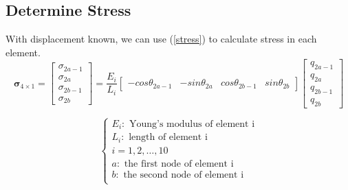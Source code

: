 \documentclass[12pt, a4paper]{article}
\begin{document}
\subsection{Determine Stress} 
    \qquad With displacement known, we can use (\ref{stress}) to calculate stress in each element.
    \begin{equation}
        \mathbf{\sigma}_{4\times1}=
        \left[
        \begin{array}{c}
             \sigma_{2a-1}  \\\sigma_{2a}\\\sigma_{2b-1}\\\sigma_{2b}
        \end{array}
        \right]
        =\frac{E_i}{L_i}
        \left[
        \begin{smallmatrix}
            -cos\theta_{2a-1}& -sin\theta_{2a}& cos\theta_{2b-1} & sin\theta_{2b}
        \end{smallmatrix}
        \right]
        \left[
        \begin{array}{c}
            q_{2a-1}  \\q_{2a}\\q_{2b-1}\\q_{2b}
        \end{array}
        \right]
        \label{stress}
    \end{equation}
    
    \begin{equation*}
        \left\{
        \begin{array}{l}
            E_i:\textrm{ Young's modulus of element i}\\
            L_i:\textrm{ length of element i}\\
            i=1,2,\ldots,10\\
            a:\textrm{ the first node of element i} \\
            b:\textrm{ the second node of element i} \\
        \end{array}
        \right.
    \end{equation*}
\end{document}
